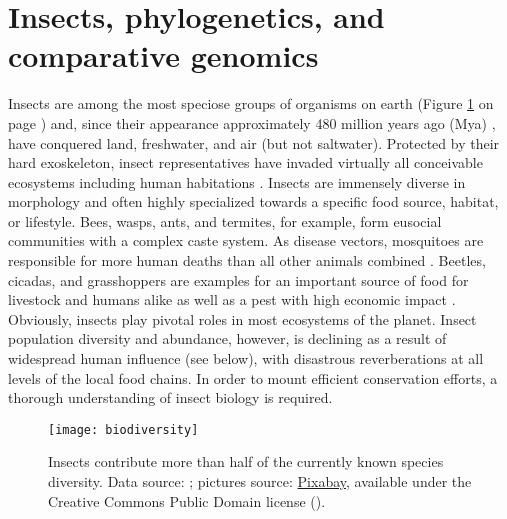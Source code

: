 \section{Insects, phylogenetics, and comparative genomics}

Insects are among the most speciose groups of organisms on earth (Figure
\ref{fig:biodiversity} on page \pageref{fig:biodiversity}) and, since
their appearance approximately 480 million years ago (Mya)
\citep{Misof2014}, have conquered land, freshwater, and air (but not
saltwater). Protected by their hard exoskeleton, insect representatives
have invaded virtually all conceivable ecosystems including human
habitations \citep{Bertone2016}.  Insects are immensely diverse in
morphology \citep{Grimaldi2005} and often highly specialized towards a
specific food source, habitat, or lifestyle. Bees, wasps, ants, and
termites, for example, form eusocial communities with a complex caste
system. As disease vectors, mosquitoes are responsible for more human
deaths than all other animals combined \citep{WHO2017, Linnell2011,
Lamarque2009, DeMaddalena2008, Kasturiratne2008, Packer2005}. Beetles,
cicadas, and grasshoppers are examples for an important source of food
for livestock and humans alike as well as a pest with high economic
impact \citep{Oliveira2014}. Obviously, insects play pivotal roles in
most ecosystems of the planet. Insect population diversity and
abundance, however, is declining \citep{Vogel2017} as a result of
widespread human influence (see below), with disastrous reverberations
at all levels of the local food chains.  In order to mount efficient
conservation efforts, a thorough understanding of insect biology is
required.

\begin{figure}[t]
\centering
\texttt{[image: biodiversity]}
\caption[Biodiversity by numbers of species]
{Insects contribute more than half of the currently known species
diversity. Data source: \citet{IUCN2018}; pictures source:
\href{https://pixabay.com}{Pixabay}, available under the Creative
Commons Public Domain license
(\href{https://creativecommons.org/publicdomain/zero/1.0}{\footnotesize{\cczero}}).}
\label{fig:biodiversity}
\end{figure}

